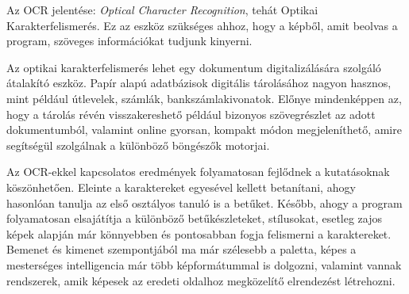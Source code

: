 
Az OCR jelentése: \textit{Optical Character Recognition}, tehát Optikai Karakterfelismerés. Ez az eszköz szükséges ahhoz, hogy a képből, amit beolvas a program, szöveges információkat tudjunk kinyerni.

Az optikai karakterfelismerés lehet egy dokumentum digitalizálására szolgáló átalakító eszköz. Papír alapú adatbázisok digitális tárolásához nagyon hasznos, mint például útlevelek, számlák, bankszámlakivonatok. Előnye mindenképpen az, hogy a tárolás révén visszakereshető például bizonyos szövegrészlet az adott dokumentumból, valamint online gyorsan, kompakt módon megjeleníthető, amire segítségül szolgálnak a különböző böngészők motorjai. 

Az OCR-ekkel kapcsolatos eredmények folyamatosan fejlődnek a kutatásoknak köszönhetően. Eleinte a karaktereket egyesével kellett betanítani, ahogy hasonlóan tanulja az első osztályos tanuló is a betűket. Később, ahogy a program folyamatosan elsajátítja a különböző betűkészleteket, stílusokat, esetleg zajos képek alapján már könnyebben és pontosabban fogja felismerni a karaktereket. Bemenet és kimenet szempontjából ma már szélesebb a paletta, képes a mesterséges intelligencia már több képformátummal is dolgozni, valamint vannak rendszerek, amik képesek az eredeti oldalhoz megközelítő elrendezést létrehozni.



